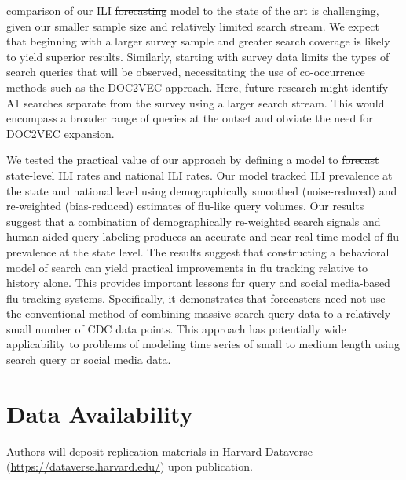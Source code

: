 \documentclass[fleqn,10pt]{wlscirep}
\providecommand{\DIFadd}[1]{{\protect\color{blue}\uwave{#1}}} %
\providecommand{\DIFdel}[1]{{\protect\color{red}\sout{#1}}}                      %
\providecommand{\DIFaddbegin}{} %
\providecommand{\DIFaddend}{} %
\providecommand{\DIFdelbegin}{} %
\providecommand{\DIFdelend}{} %
\begin{document}
\DIFadd{Finally, }\DIFaddend comparison of our ILI \DIFdelbegin \DIFdel{forecasting }\DIFdelend \DIFaddbegin \DIFadd{tracking }\DIFaddend model to the state of the art is challenging, given our smaller sample size and relatively limited search stream. We expect that beginning with a larger survey sample and greater search coverage is likely to yield superior results. Similarly, starting with survey data limits the types of search queries that will be observed, necessitating the use of co-occurrence methods such as the DOC2VEC approach. Here, future research might identify A1 searches separate from the survey using a larger search stream. This would encompass a broader range of queries at the outset and obviate the need for DOC2VEC expansion. 

We tested the practical value of our approach by defining a model to \DIFdelbegin \DIFdel{forecast }\DIFdelend \DIFaddbegin \DIFadd{track }\DIFaddend state-level ILI rates and national ILI rates. Our model tracked ILI prevalence at the state and national level using demographically smoothed (noise-reduced) and re-weighted (bias-reduced) estimates of flu-like query volumes. Our results suggest that a combination of demographically re-weighted search signals and human-aided query labeling produces an accurate and near real-time model of flu prevalence at the state level. The results suggest that constructing a behavioral model of search can yield practical improvements in flu tracking relative to history alone. This provides important lessons for query and social media-based flu tracking systems. Specifically, it demonstrates that forecasters need not use the conventional method of combining massive search query data to a relatively small number of CDC data points. This approach has potentially wide applicability to problems of modeling time series of small to medium length using search query or social media data. 



\section*{Data Availability}
Authors will deposit replication materials in Harvard Dataverse (\url{https://dataverse.harvard.edu/}) upon publication. 
\end{document}
